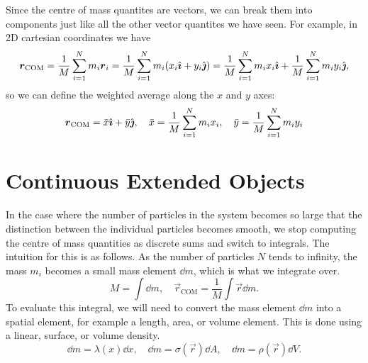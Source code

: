 \documentclass[../classical_mechanics.tex]{subfiles}
\begin{document}
        Since the centre of mass quantites are vectors, we can break them into components just like all the other vector quantites we have seen.
        For example, in 2D cartesian coordinates we have
        \begin{equation}
            \boldsymbol{r}_\text{COM}=\frac{1}{M}\sum_{i=1}^N m_i\boldsymbol{r}_i=\frac{1}{M}\sum_{i=1}^N m_i(x_i\hat{\boldsymbol{\imath}}+y_i\hat{\boldsymbol{\jmath}})=\frac{1}{M}\sum_{i=1}^N m_ix_i\hat{\boldsymbol{\imath}}+\frac{1}{M}\sum_{i=1}^N m_iy_i\hat{\boldsymbol{\jmath}},
        \end{equation}
        so we can define the weighted average along the $x$ and $y$ axes:
        \begin{equation}
            \boldsymbol{r}_\text{COM}=\bar{x}\hat{\boldsymbol{\imath}}+\bar{y}\hat{\boldsymbol{\jmath}},\quad\bar{x}=\frac{1}{M}\sum_{i=1}^N m_ix_i,\quad\bar{y}=\frac{1}{M}\sum_{i=1}^N m_iy_i
        \end{equation}

    \section{Continuous Extended Objects}\label{sec:continuous-extended-objects}
        In the case where the number of particles in the system becomes so large that the distinction between the individual particles becomes smooth, we stop computing the centre of mass quantities as discrete sums and switch to integrals.
        The intuition for this is as follows.
        As the number of particles $N$ tends to infinity, the mass $m_i$ becomes a small mass element $\dd{m}$, which is what we integrate over.
        \begin{equation}
            M=\int\dd{m},\quad\vec{r}_\text{COM}=\frac{1}{M}\int\vec{r}\dd{m}.
        \end{equation}
        To evaluate this integral, we will need to convert the mass element $\dd{m}$ into a spatial element, for example a length, area, or volume element.
        This is done using a linear, surface, or volume density.
        \begin{equation}
            \dd{m}=\lambda(x)\dd{x},\quad\dd{m}=\sigma(\vec{r})\dd{A},\quad\dd{m}=\rho(\vec{r})\dd{V}.
        \end{equation}
\end{document}
